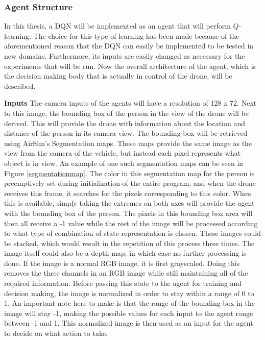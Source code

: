 \subsubsection{Agent Structure}
In this thesis, a DQN will be implemented as an agent that will perform $Q$-learning. 
The choice for this type of learning has been made because 
of the aforementioned reason that the DQN can easily be implemented to be tested in 
new domains. Furthermore, its inputs are easily changed as necessary for the experiments that 
will be run. Now the overall architecture of the agent, which is the decision making body 
that is actually in control of the drone, will be described. \newline

\noindent
\textbf{Inputs} \label{inputs} \newline
The camera inputs of the agents will have a resolution of 128 x 72. Next to this image, the 
bounding box of the person in the view of the drone will be derived. This will provide 
the drone with information about the location and distance of the person in its camera view.
The bounding box will be retrieved using AirSim's Segmentation maps. These maps provide the 
same image as the view from the camera of the vehicle, but instead each pixel represents what object
is in view. An example of one such segmentation maps can be seen in Figure \ref{segmentationmap}. 
The color in this segmentation map for the person is preemptively set during initialization of the 
entire program, and when the drone receives this frame, it searches for the pixels corresponding 
to this color. When this is available, simply taking the extremes 
on both axes will provide the agent with the bounding box of the person. The pixels in 
this bounding box 
area will then all receive a -1 value while the rest of the image will be processed according 
to what type of combination of state-representation is chosen. These images could be 
stacked, which would result in the repetition of this process three times. The image 
itself could also be a depth map, in which case no further processing is done. If the image 
is a normal RGB image, it is first grayscaled. Doing this removes the three channels 
in an RGB image while still maintaining all of the required information. Before passing this 
state to the agent for training and 
decision making, the image is normalized in order to stay within a range of 0 to 1. An important 
note here to make is that the range of the bounding box in the image will stay -1, making the 
possible values for each input to the agent range between -1 and 1. This normalized image is 
then used as an input for the agent to decide on what action to take. \newline

